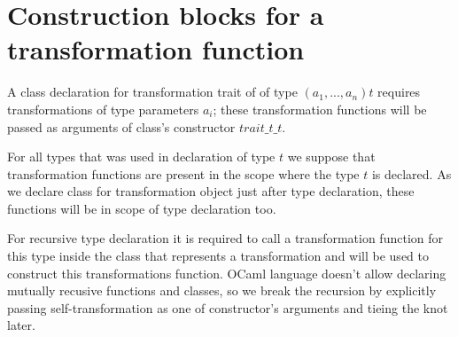 \documentclass[acmsmall,review,anonymous]{acmart}\settopmatter{printfolios=true,printccs=false,printacmref=false}
\begin{document}
\section{Construction blocks for a transformation function}
A class declaration for transformation trait of of type $(a_1,...,a_n) t$ requires transformations of type parameters $a_i$; these transformation functions will be passed as arguments of class's constructor $trait\_t\_t$.

For all types that was used in declaration of type $t$ we suppose that transformation functions are present in the scope where the type $t$ is declared. As we declare class for transformation object just after type declaration, these functions will be in scope of type declaration too.

For recursive type declaration it is required to call a transformation function for this type inside the class that represents a transformation and will be used to construct this transformations function. OCaml language doesn't allow declaring mutually recusive functions and classes, so we break the recursion by explicitly passing self-transformation as one of constructor's arguments and tieing the knot later. 

% 
% 
% 
\end{document}
